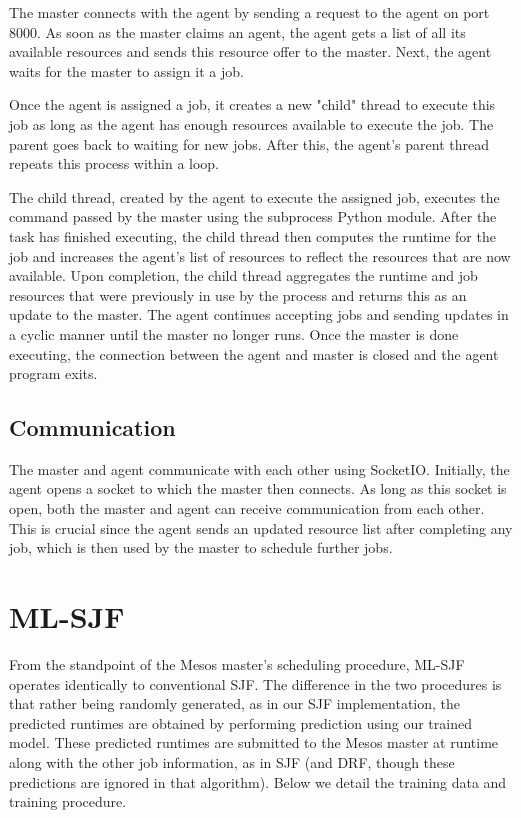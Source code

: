 \documentclass{hotnets19}
\begin{document}
The master connects with the agent by sending a request to the agent on port 8000. As soon as the master claims an agent, the agent gets a list of all its available resources and sends this resource offer to the master. Next, the agent waits for the master to assign it a job. 

Once the agent is assigned a job, it creates a new "child" thread to execute this job as long as the agent has enough resources available to execute the job. The parent goes back to waiting for new jobs. After this, the agent's parent thread repeats this process within a loop. 

The child thread, created by the agent to execute the assigned job, executes the command passed by the master using the subprocess Python module. After the task has finished executing, the child thread then computes the runtime for the job and increases the agent's list of resources to reflect the resources that are now available. Upon completion, the child thread aggregates the runtime and job resources that were previously in use by the process and returns this as an update to the master.
The agent continues accepting jobs and sending updates in a cyclic manner until the master no longer runs. Once the master is done executing, the connection between the agent and master is closed and the agent program exits.

\subsection{Communication}
The master and agent communicate with each other using SocketIO.
Initially, the agent opens a socket to which the master then connects.
As long as this socket is open, both the master and agent can receive communication from each other.
This is crucial since the agent sends an updated resource list after completing any job, which is then used by the master to schedule further jobs.

\section{ML-SJF}
From the standpoint of the Mesos master's scheduling procedure, ML-SJF operates identically to conventional SJF. The difference in the two procedures is that rather being randomly generated, as in our SJF implementation, the predicted runtimes are obtained by performing prediction using our trained model. These predicted runtimes are submitted to the Mesos master at runtime along with the other job information, as in SJF (and DRF, though these predictions are ignored in that algorithm). Below we detail the training data and training procedure.
\end{document}
